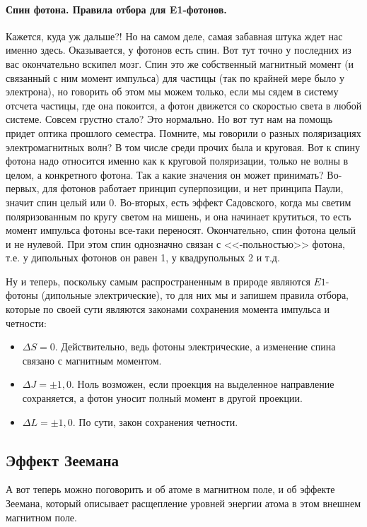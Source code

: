 \documentclass[12pt]{article}
\begin{document}
\paragraph{Спин фотона. Правила отбора для E1-фотонов.} Кажется, куда уж дальше?! Но на самом деле, самая забавная штука ждет нас именно здесь. Оказывается, у фотонов есть спин. Вот тут точно у последних из вас окончательно вскипел мозг. Спин это же собственный магнитный момент (и связанный с ним момент импульса) для частицы (так по крайней мере было у электрона), но говорить об этом мы можем только, если мы сядем в систему отсчета частицы, где она покоится, а фотон движется со скоростью света в любой системе.  Совсем грустно стало? Это нормально. Но вот тут нам на помощь придет оптика прошлого семестра. Помните, мы говорили о разных поляризациях электромагнитных волн? В том числе среди прочих была и круговая. Вот к спину фотона надо относится именно как к круговой поляризации, только не волны в целом, а конкретного фотона. Так а какие значения он может принимать? Во-первых, для фотонов работает принцип суперпозиции, и нет принципа Паули, значит спин целый или 0. Во-вторых, есть эффект Садовского, когда мы светим поляризованным по кругу светом на мишень, и она начинает крутиться, то есть момент импульса фотоны все-таки переносят. Окончательно, спин фотона целый и не нулевой. При этом спин однозначно связан с <<-польностью>> фотона, т.е. у дипольных фотонов он равен 1, у квадрупольных 2 и т.д.

Ну и теперь, поскольку самым распространенным в природе являются $E1$- фотоны (дипольные электрические), то для них мы и запишем правила отбора, которые по своей сути являются законами сохранения момента импульса и четности:
\begin{itemize}
    \item $\Delta S =0$. Действительно, ведь фотоны электрические, а изменение спина связано с магнитным моментом.
    \item $\Delta J = \pm 1, 0$. Ноль возможен, если проекция на выделенное направление сохраняется, а фотон уносит полный момент в другой проекции.
    \item $\Delta L = \pm 1, 0$. По сути, закон сохранения четности.
\end{itemize}

\subsection{Эффект Зеемана}
А вот теперь можно поговорить и об атоме в магнитном поле, и об эффекте Зеемана, который описывает расщепление уровней энергии атома в этом внешнем магнитном поле.
\end{document}

